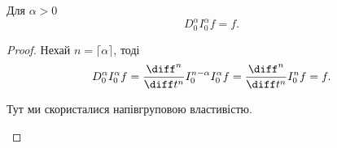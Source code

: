 \begin{theorem}
    Для $\alpha > 0$
    \begin{equation}
        D_0^\alpha I_0^\alpha f = f.
    \end{equation}
\end{theorem}
\begin{proof}
    Нехай $n = \lceil \alpha \rceil$, тоді
    \begin{equation}
        D_0^\alpha I_0^\alpha f = \frac{\diff^n}{\diff t^n} I_0^{n - \alpha} I_0^{\alpha} f = \frac{\diff^n}{\diff t^n} I_0^n f = f. 
    \end{equation}
    \begin{remark}
        Тут ми скористалися напівгруповою властивістю.
    \end{remark}
\end{proof}

